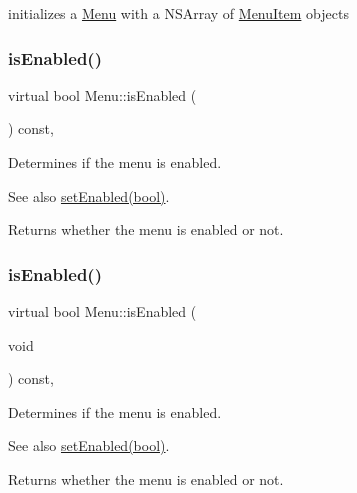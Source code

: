 initializes a \hyperlink{classMenu}{Menu} with a N\+S\+Array of \hyperlink{classMenuItem}{Menu\+Item} objects \mbox{\label{classMenu_a8d594f61997bb6ed9f62b083ed7a6001}} 
\subsubsection{\texorpdfstring{is\+Enabled()}{isEnabled()}\hspace{0.1cm}{\footnotesize\ttfamily [1/2]}}
{\footnotesize\ttfamily virtual bool Menu\+::is\+Enabled (\begin{DoxyParamCaption}{ }\end{DoxyParamCaption}) const\hspace{0.3cm}{\ttfamily [inline]}, {\ttfamily [virtual]}}

Determines if the menu is enabled. \begin{DoxySeeAlso}{See also}
{\ttfamily \hyperlink{classMenu_a3f1338bc3391dd127892035935b48cdc}{set\+Enabled(bool)}}. 
\end{DoxySeeAlso}
\begin{DoxyReturn}{Returns}
whether the menu is enabled or not. 
\end{DoxyReturn}
\mbox{\label{classMenu_a8d594f61997bb6ed9f62b083ed7a6001}} 
\subsubsection{\texorpdfstring{is\+Enabled()}{isEnabled()}\hspace{0.1cm}{\footnotesize\ttfamily [2/2]}}
{\footnotesize\ttfamily virtual bool Menu\+::is\+Enabled (\begin{DoxyParamCaption}\item[{void}]{ }\end{DoxyParamCaption}) const\hspace{0.3cm}{\ttfamily [inline]}, {\ttfamily [virtual]}}

Determines if the menu is enabled. \begin{DoxySeeAlso}{See also}
{\ttfamily \hyperlink{classMenu_a3f1338bc3391dd127892035935b48cdc}{set\+Enabled(bool)}}. 
\end{DoxySeeAlso}
\begin{DoxyReturn}{Returns}
whether the menu is enabled or not. 
\end{DoxyReturn}
\mbox{\label{classMenu_ae173fda432df51ec761c8ef5d96ea59a}} 
